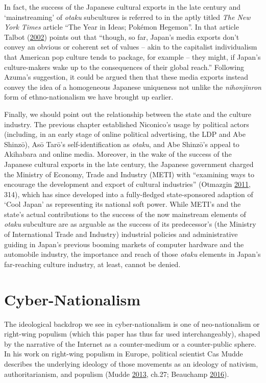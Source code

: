 \documentclass[10pt,british,A4paper,oneside]{memoir}
\begin{document}
In fact, the success of the Japanese cultural exports in the late
 century and `mainstreaming' of \emph{otaku} subcultures is
referred to in the aptly titled \emph{The New York Times} article ``The
Year in Ideas; Pokémon Hegemon''. In that article Talbot
(\protect\hyperlink{ref-talbot_year_2002}{2002}) points out that
``though, so far, Japan's media exports don't convey an obvious or
coherent set of values -- akin to the capitalist individualism that
American pop culture tends to package, for example -- they might, if
Japan's culture-makers wake up to the consequences of their global
reach.'' Following Azuma's suggestion, it could be argued then that
these media exports instead convey the idea of a homogeneous Japanese
uniqueness not unlike the \emph{nihonjinron} form of ethno-nationalism
we have brought up earlier.

Finally, we should point out the relationship between the state and the
culture industry. The previous chapter established Niconico's usage by
political actors (including, in an early stage of online political
advertising, the LDP and Abe Shinzō), Asō Tarō's self-identification as
\emph{otaku}, and Abe Shinzō's appeal to Akihabara and online media.
Moreover, in the wake of the success of the Japanese cultural exports in
the late  century, the Japanese government charged the Ministry
of Economy, Trade and Industry (METI) with ``examining ways to encourage
the development and export of cultural industries'' (Otmazgin
\protect\hyperlink{ref-otmazgin_tail_2011}{2011}, 314), which has since
developed into a fully-fledged state-sponsored adaption of `Cool Japan'
as representing its national soft power. While METI's and the state's
actual contributions to the success of the now mainstream elements of
\emph{otaku} subculture are as arguable as the success of its
predecessor's (the Ministry of International Trade and Industry)
industrial policies and administrative guiding in Japan's previous
booming markets of computer hardware and the automobile industry, the
importance and reach of those \emph{otaku} elements in Japan's
far-reaching culture industry, at least, cannot be denied.

\section{Cyber-Nationalism}\label{cyber-nationalism}

The ideological backdrop we see in cyber-nationalism is one of
neo-nationalism or right-wing populism (which this paper has thus far
used interchangeably), shaped by the narrative of the Internet as a
counter-medium or a counter-public sphere. In his work on right-wing
populism in Europe, political scientist Cas Mudde describes the
underlying ideology of those movements as an ideology of nativism,
authoritarianism, and populism (Mudde
\protect\hyperlink{ref-mudde_oxford_2013}{2013}, ch.27; Beauchamp
\protect\hyperlink{ref-beauchamp_expert_2016}{2016}).
\end{document}
